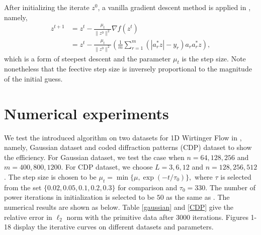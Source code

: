 \documentclass{article}
\begin{document}
After initializing the iterate $z^0$, a vanilla gradient descent method is applied in \cite{candes2015phase}, namely,
\begin{equation}
	\begin{aligned}
		z^{t+1} &= z^t - \frac{\mu_t}{\|z^0\|^2}\nabla f(z^t)\\
		&= z^t - \frac{\mu_t}{\|z^0\|^2}(\frac{1}{m}\sum_{r=1}^m(|a_r^*z|-y_r)a_ra_r^*z),
	\end{aligned}
\end{equation}
which is a form of steepest descent and the parameter $\mu_t$ is the step size. Note nonetheless that the feective step size is inversely proportional to the magnitude of the initial guess.
\section{Numerical experiments}
We test the introduced algorithm on two datasets for 1D Wirtinger Flow in \cite{candes2015phase}, namely, Gaussian dataset and coded diffraction patterns (CDP) dataset to show the efficiency. For Gaussian dataset, we test the case when $n=64,128,256$ and $m=400,800,1200$. For CDP dataset, we choose $L=3,6,12$ and $n=128,256,512$. The step size is chosen to be $\mu_t = \min\{\mu,\exp(-t/\tau_0)\},$ where $\tau$ is selected from the set $\{0.02,0.05,0.1,0.2,0.3\}$ for comparison and $\tau_0 = 330$. The number of power iterations in initialization is selected to be $50$ as the same as \cite{candes2015phase}. The numerical results are shown as below. Table \ref{gaussian} and \ref{CDP} give the relative error in $\ell_2$ norm with the primitive data after $3000$ iterations. Figures 1-18 display the iterative curves on different datasets and parameters.
\end{document}
